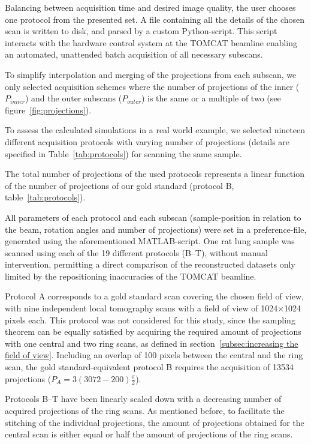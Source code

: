 \documentclass[preprint,s]{iucr}
\begin{document}
Balancing between acquisition time and desired image quality, the user chooses one protocol from the presented set. A file containing all the details of the chosen scan is written to disk, and parsed by a custom Python-script. This script interacts with the hardware control system at the TOMCAT beamline enabling an automated, unattended batch acquisition of all necessary subscans.

To simplify interpolation and merging of the projections from each subscan, we only selected acquisition schemes where the number of projections of the inner ($P_{inner}$) and the outer subscans ($P_{outer}$) is the same or a multiple of two (see figure~\ref{fig:projections}).

To assess the calculated simulations in a real world example, we selected nineteen different acquisition protocols with varying number of projections (details are specified in Table~\ref{tab:protocols}) for scanning the same sample. 

The total number of projections of the used protocols represents a linear function of the number of projections of our gold standard (protocol B, table~\ref{tab:protocols}).

All parameters of each protocol and each subscan (sample-position in relation to the beam, rotation angles and number of projections) were set in a preference-file, generated using the aforementioned MATLAB-script. One rat lung sample was scanned using each of the 19 different protocols (B--T), without manual intervention, permitting a direct comparison of the reconstructed datasets only limited by the repositioning inaccuracies of the TOMCAT beamline.

Protocol A corresponds to a gold standard scan covering the chosen field of view, with nine independent local tomography scans with a field of view of 1024$\times$1024 pixels each. This protocol was not considered for this study, since the sampling theorem can be equally satisfied by acquiring the required amount of projections with one central and two ring scans, as defined in section~\ref{subsec:increasing the field of view}. Including an overlap of 100 pixels between the central and the ring scan, the gold standard-equivalent protocol B requires the acquisition of 13534 projections ($P_{A}=3(3072-200)\frac{\pi}{2}$).

Protocols B--T have been linearly scaled down with a decreasing number of acquired projections of the ring scans. As mentioned before, to facilitate the stitching of the individual projections, the amount of projections obtained for the central scan is either equal or half the amount of projections of the ring scans.
\end{document}
